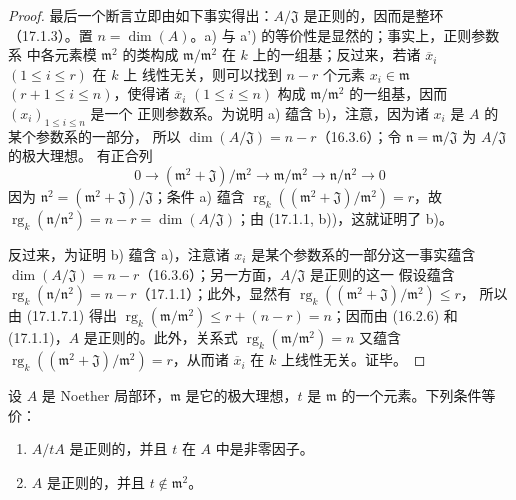 \begin{proof}
最后一个断言立即由如下事实得出：$A/\mathfrak{J}$ 是正则的，因而是整环
（17.1.3）。置 $n=\dim(A)$。a) 与 a') 的等价性是显然的；事实上，正则参数系
中各元素模 $\mathfrak{m}^2$ 的类构成 $\mathfrak{m}/\mathfrak{m}^2$ 在 $k$
上的一组基；反过来，若诸 $\overline{x}_i$ $(1\leq i\leq r)$ 在 $k$ 上
线性无关，则可以找到 $n-r$ 个元素 $x_i\in\mathfrak{m}$
$(r+1\leq i\leq n)$，使得诸 $\overline{x}_i$ $(1\leq i\leq n)$ 构成
$\mathfrak{m}/\mathfrak{m}^2$ 的一组基，因而 $(x_i)_{1\leq i\leq n}$ 是一个
正则参数系。为说明 a) 蕴含 b)，注意，因为诸 $x_i$ 是 $A$ 的某个参数系的一部分，
所以
$\dim(A/\mathfrak{J})=n-r$（16.3.6）；令
$\mathfrak{n}=\mathfrak{m}/\mathfrak{J}$ 为 $A/\mathfrak{J}$ 的极大理想。
有正合列
\begin{equation}
\label{0.17.1.7.1-fr}
\tag{17.1.7.1}
  0\longrightarrow(\mathfrak{m}^2+\mathfrak{J})/\mathfrak{m}^2
  \longrightarrow\mathfrak{m}/\mathfrak{m}^2
  \longrightarrow\mathfrak{n}/\mathfrak{n}^2\longrightarrow0
\end{equation}
因为 $\mathfrak{n}^2=(\mathfrak{m}^2+\mathfrak{J})/\mathfrak{J}$；条件 a) 蕴含
$\operatorname{rg}_k((\mathfrak{m}^2+\mathfrak{J})/\mathfrak{m}^2)=r$，故
$\operatorname{rg}_k(\mathfrak{n}/\mathfrak{n}^2)=n-r
=\dim(A/\mathfrak{J})$；由 (17.1.1, b))，这就证明了 b)。

反过来，为证明 b) 蕴含 a)，注意诸 $x_i$ 是某个参数系的一部分这一事实蕴含
$\dim(A/\mathfrak{J})=n-r$（16.3.6）；另一方面，$A/\mathfrak{J}$ 是正则的这一
假设蕴含
$\operatorname{rg}_k(\mathfrak{n}/\mathfrak{n}^2)=n-r$（17.1.1）；此外，显然有
$\operatorname{rg}_k((\mathfrak{m}^2+\mathfrak{J})/\mathfrak{m}^2)\leq r$，
所以由 (17.1.7.1) 得出
$\operatorname{rg}_k(\mathfrak{m}/\mathfrak{m}^2)\leq r+(n-r)=n$；因而由
(16.2.6) 和 (17.1.1)，$A$ 是正则的。此外，关系式
$\operatorname{rg}_k(\mathfrak{m}/\mathfrak{m}^2)=n$ 又蕴含
$\operatorname{rg}_k((\mathfrak{m}^2+\mathfrak{J})/\mathfrak{m}^2)=r$，从而诸
$\overline{x}_i$ 在 $k$ 上线性无关。证毕。
\end{proof}


\begin{corollary}[17.1.8]
\label{0.17.1.8-fr}
设 $A$ 是 Noether 局部环，$\mathfrak{m}$ 是它的极大理想，$t$ 是
$\mathfrak{m}$ 的一个元素。下列条件等价：
\begin{enumerate}
  \item[\rm a)] $A/tA$ 是正则的，并且 $t$ 在 $A$ 中是非零因子。
  \item[\rm b)] $A$ 是正则的，并且 $t\notin\mathfrak{m}^2$。
\end{enumerate}
\end{corollary}

